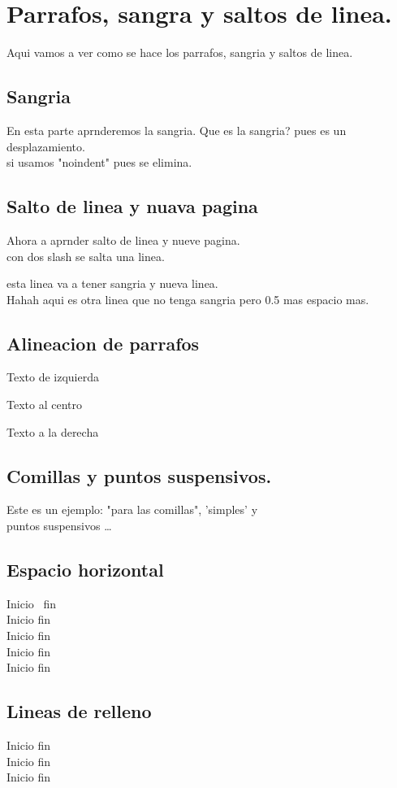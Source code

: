 \documentclass[12pt]{book}
\begin{document}
\section{Parrafos, sangra y saltos de linea.}
Aqui vamos a ver como se hace los parrafos, sangria y saltos de linea. 

\subsection{Sangria}
En esta parte aprnderemos la sangria. 
Que es la sangria? pues es un desplazamiento. \\
\noindent si usamos "noindent" pues se elimina. 

\subsection{Salto de linea y nuava pagina}
Ahora a aprnder salto de linea y nueve pagina. \\
con dos slash se salta una linea. 
\par esta linea va a tener sangria y nueva linea.\\[0.5mm]
Hahah aqui es otra linea que no tenga sangria pero 0.5 mas espacio mas. 
 
\subsection{Alineacion de parrafos}
\begin{flushleft}
Texto de izquierda
\end{flushleft}

\begin{center}
Texto al centro
\end{center}

\begin{flushright}
Texto a la derecha
\end{flushright}

\subsection{Comillas y puntos suspensivos. }
Este es un ejemplo: "para las comillas", 'simples' y \\ puntos suspensivos \dots 

\subsection{Espacio horizontal}
Inicio \, fin\\[0.2cm]
Inicio \quad fin\\[0.2cm]
Inicio \qquad fin\\[0.2cm]
Inicio \hspace{2cm} fin\\[0.2cm]
Inicio \hfill fin\\[0.2cm]

\subsection{Lineas de relleno}
Inicio \hfill fin\\[0.2cm]
Inicio \hrulefill fin\\[0.2cm]
Inicio \dotfill fin\\[0.2cm]
\end{document}
